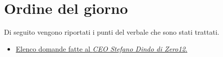 \clearpage
\section{Ordine del giorno}
Di seguito vengono riportati i punti del verbale che sono stati trattati.
\begin{itemize}
	\item \hyperref[sec:elenco]{Elenco domande fatte al \emph{CEO Stefano Dindo di Zero12}.}
\end{itemize}